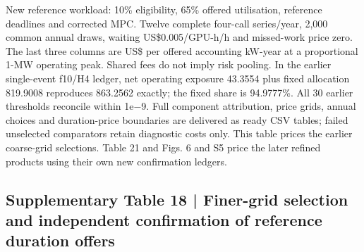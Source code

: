 \documentclass[10pt,a4paper]{article}
\begin{document}
New reference workload: 10\% eligibility, 65\% offered utilisation, reference deadlines and corrected MPC. Twelve complete four-call series/year, 2,000 common annual draws, waiting US\$0.005/GPU-h/h and missed-work price zero. The last three columns are US\$ per offered accounting kW-year at a proportional 1-MW operating peak. Shared fees do not imply risk pooling. In the earlier single-event f10/H4 ledger, net operating exposure 43.3554 plus fixed allocation 819.9008 reproduces 863.2562 exactly; the fixed share is 94.9777\%. All 30 earlier thresholds reconcile within 1e−9. Full component attribution, price grids, annual choices and duration-price boundaries are delivered as ready CSV tables; failed unselected comparators retain diagnostic costs only. This table prices the earlier coarse-grid selections. Table 21 and Figs. 6 and S5 price the later refined products using their own new confirmation ledgers.


\pagebreak[2]
\subsection{Supplementary Table 18 | Finer-grid selection and independent confirmation of reference duration offers}
\end{document}
